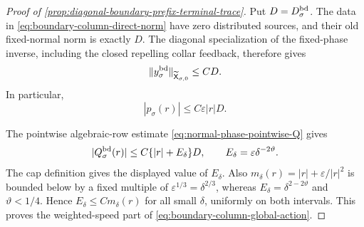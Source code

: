 \begin{proof}[Proof of
\cref{prop:diagonal-boundary-prefix-terminal-trace}]
Put \(D=D_\sigma^{\rm bd}\).  The data in
\cref{eq:boundary-column-direct-norm} have zero distributed sources, and
their old fixed-normal norm is exactly \(D\).  The diagonal specialization
of the fixed-phase inverse, including the closed repelling collar feedback,
therefore gives
\begin{equation}
 \|y_\sigma^{\rm bd}\|_{\widetilde{\mathsf X}_{\sigma,0}}
 \le CD.                                         \label{eq:proof-boundary-global-state}
\end{equation}
In particular,
\begin{equation}
 |p_\sigma(r)|\le C\varepsilon |r|D.             \label{eq:proof-boundary-p-pointwise}
\end{equation}

The pointwise algebraic-row estimate
\cref{eq:normal-phase-pointwise-Q} gives
\begin{equation}
 |Q_\sigma^{\rm bd}(r)|
 \le C\{|r|+E_\delta\}D,\qquad
 E_\delta=\varepsilon\delta^{-2\vartheta}.       \label{eq:proof-boundary-Q-preweight}
\end{equation}
The cap definition gives the displayed value of \(E_\delta\).  Also
\(m_\delta(r)=|r|+\varepsilon/|r|^2\) is bounded below by a fixed
multiple of \(\varepsilon^{1/3}=\delta^{2/3}\), whereas
\(E_\delta=\delta^{2-2\vartheta}\) and
\(\vartheta<1/4\).  Hence \(E_\delta\le Cm_\delta(r)\) for all small
\(\delta\), uniformly on both intervals.  This proves the weighted-speed
part of \cref{eq:boundary-column-global-action}.


\end{proof}

